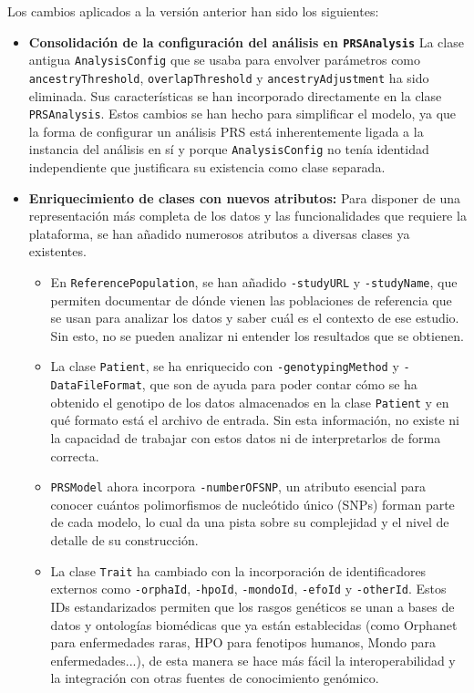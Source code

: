 Los cambios aplicados a la versión anterior han sido los siguientes: 

\begin{itemize}
    \item \textbf{Consolidación de la configuración del análisis en \texttt{PRSAnalysis}}
    La clase antigua \texttt{AnalysisConfig} que se usaba para envolver parámetros como \texttt{ancestryThreshold}, \texttt{overlapThreshold} y \texttt{ancestryAdjustment} ha sido eliminada. Sus características se han incorporado directamente en la clase \texttt{PRSAnalysis}. Estos cambios se han hecho para simplificar el modelo, ya que la forma de configurar un análisis PRS está inherentemente ligada a la instancia del análisis en sí y porque \texttt{AnalysisConfig} no tenía identidad independiente que justificara su existencia como clase separada.
    
    \item \textbf{Enriquecimiento de clases con nuevos atributos:} Para disponer de una representación más completa de los datos y las funcionalidades que requiere la plataforma, se han añadido numerosos atributos a diversas clases ya existentes. 
    
        \begin{itemize}
            \item En \texttt{ReferencePopulation}, se han añadido \texttt{-studyURL} y \texttt{-studyName}, que permiten documentar de dónde vienen las poblaciones de referencia que se usan para analizar los datos y saber cuál es el contexto de ese estudio. Sin esto, no se pueden analizar ni entender los resultados que se obtienen.
            
            \item La clase \texttt{Patient}, se ha enriquecido con \texttt{-genotypingMethod} y \texttt{-DataFileFormat}, que son de ayuda para poder contar cómo se ha obtenido el genotipo de los datos almacenados en la clase \texttt{Patient} y en qué formato está el archivo de entrada. Sin esta información, no existe ni la capacidad de trabajar con estos datos ni de interpretarlos de forma correcta.
            
            \item \texttt{PRSModel} ahora incorpora \texttt{-numberOFSNP}, un atributo esencial para conocer cuántos polimorfismos de nucleótido único (SNPs) forman parte de cada modelo, lo cual da una pista sobre su complejidad y el nivel de detalle de su construcción.
            
            \item La clase \texttt{Trait} ha cambiado con la incorporación de identificadores externos como \texttt{-orphaId}, \texttt{-hpoId}, \texttt{-mondoId}, \texttt{-efoId} y \texttt{-otherId}. Estos IDs estandarizados permiten que los rasgos genéticos se unan a bases de datos y ontologías biomédicas que ya están establecidas (como Orphanet para enfermedades raras, HPO para fenotipos humanos, Mondo para enfermedades...), de esta manera se hace más fácil la interoperabilidad y la integración con otras fuentes de conocimiento genómico.
        \end{itemize}
        

\end{itemize}
